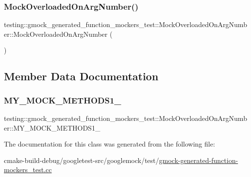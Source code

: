 \subsubsection{\texorpdfstring{MockOverloadedOnArgNumber()}{MockOverloadedOnArgNumber()}}
{\footnotesize\ttfamily testing\+::gmock\+\_\+generated\+\_\+function\+\_\+mockers\+\_\+test\+::\+Mock\+Overloaded\+On\+Arg\+Number\+::\+Mock\+Overloaded\+On\+Arg\+Number (\begin{DoxyParamCaption}{ }\end{DoxyParamCaption})\hspace{0.3cm}{\ttfamily [inline]}}



\subsection{Member Data Documentation}
\mbox{\label{classtesting_1_1gmock__generated__function__mockers__test_1_1MockOverloadedOnArgNumber_a5076ebd17fb1cc93952b4a80fe6de894}} 
\subsubsection{\texorpdfstring{MY\_MOCK\_METHODS1\_}{MY\_MOCK\_METHODS1\_}}
{\footnotesize\ttfamily testing\+::gmock\+\_\+generated\+\_\+function\+\_\+mockers\+\_\+test\+::\+Mock\+Overloaded\+On\+Arg\+Number\+::\+M\+Y\+\_\+\+M\+O\+C\+K\+\_\+\+M\+E\+T\+H\+O\+D\+S1\+\_\+}



The documentation for this class was generated from the following file\+:\begin{DoxyCompactItemize}
\item 
cmake-\/build-\/debug/googletest-\/src/googlemock/test/\mbox{\hyperlink{gmock-generated-function-mockers__test_8cc}{gmock-\/generated-\/function-\/mockers\+\_\+test.\+cc}}\end{DoxyCompactItemize}
